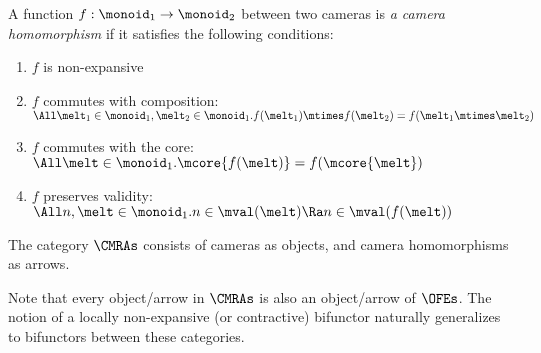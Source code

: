 \begin{defn}
  A function $f : \monoid_1 \to \monoid_2$ between two cameras is \emph{a camera homomorphism} if it satisfies the following conditions:
  \begin{enumerate}[itemsep=0pt]
  \item $f$ is non-expansive
  \item $f$ commutes with composition:\\
    $\All \melt_1 \in \monoid_1, \melt_2 \in \monoid_1. f(\melt_1) \mtimes f(\melt_2) = f(\melt_1 \mtimes \melt_2)$
  \item $f$ commutes with the core:\\
    $\All \melt \in \monoid_1. \mcore{f(\melt)} = f(\mcore{\melt})$
  \item $f$ preserves validity: \\
    $\All n, \melt \in \monoid_1. n \in \mval(\melt) \Ra n \in \mval(f(\melt))$
  \end{enumerate}
\end{defn}

\begin{defn}
  The category $\CMRAs$ consists of cameras as objects, and camera homomorphisms as arrows.
\end{defn}
Note that every object/arrow in $\CMRAs$ is also an object/arrow of $\OFEs$.
The notion of a locally non-expansive (or contractive) bifunctor naturally generalizes to bifunctors between these categories.

